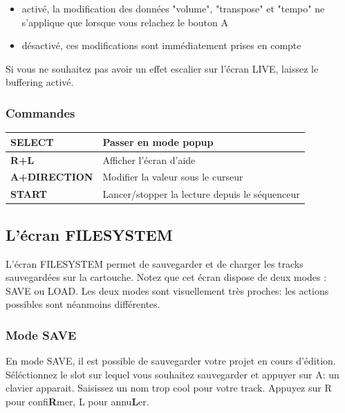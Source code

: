 \documentclass[12pt,a4paper]{article}
\begin{document}
    \begin{itemize}
        \item{activé, la modification des données "volume", "transpose" et "tempo" ne s'applique que lorsque vous relachez le bouton A}
        \item{désactivé, ces modifications sont immédiatement prises en compte}
    \end{itemize}
    \medskip
    Si vous ne souhaitez pas avoir un effet escalier sur l'écran LIVE, laissez le buffering activé.

    \subsubsection{Commandes}
    \tablelasttail{\hline}
    \begin{supertabular}{|l|p{11cm}|}
    \hline
        {\bf SELECT} & Passer en mode popup \\
        \hline
        {\bf R+L} & Afficher l'écran d'aide \\
        \hline
        {\bf A+DIRECTION} & Modifier la valeur sous le curseur \\
        \hline
        {\bf START} & Lancer/stopper la lecture depuis le séquenceur \\
    \hline
    \end{supertabular}
    
    \subsection{L'écran FILESYSTEM}\label{filesystem}
    
    L'écran FILESYSTEM permet de sauvegarder et de charger les tracks sauvegardées sur la cartouche.
    Notez que cet écran dispose de deux modes : SAVE ou LOAD.
    Les deux modes sont visuellement très proches: les actions possibles sont néanmoins différentes.
    
    \subsubsection{Mode SAVE}

    En mode SAVE, il est possible de sauvegarder votre projet en cours d'édition.
    Séléctionnez le slot sur lequel vous souhaitez sauvegarder et appuyer sur A: un clavier apparait.
    Saisissez un nom trop cool pour votre track. Appuyez sur R pour confi{\bf R}mer, L pour annu{\bf L}er.
\end{document}
